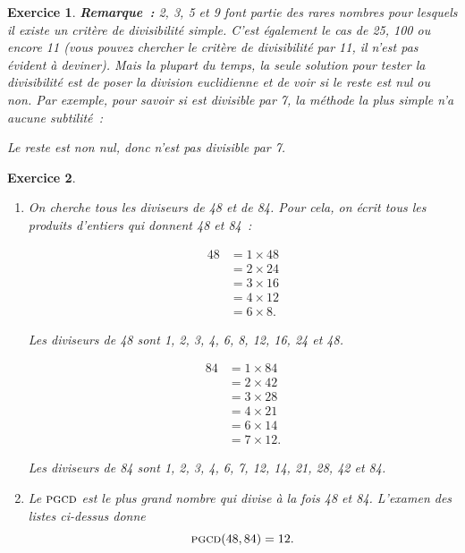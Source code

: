 \documentclass[10pt]{article}
\newtheorem{exo}{Exercice}
\begin{document}
\begin{exo}
\medskip

\textbf{Remarque~:} 2, 3, 5 et 9 font partie des rares nombres pour lesquels il existe un critère de divisibilité simple. C'est également le cas de 25, 100 ou encore 11 (vous pouvez chercher le critère de divisibilité par 11, il n'est pas évident à deviner). Mais la plupart du temps, la seule solution pour tester la divisibilité est de poser la division euclidienne et de voir si le reste est nul ou non. Par exemple, pour savoir si  est divisible par 7, la méthode la plus simple n'a aucune subtilité~:

\begin{center}
\end{center}

Le reste est non nul, donc  n'est pas divisible par 7.

\end{exo}

\begin{exo}
\begin{enumerate}
\item On cherche tous les diviseurs de 48 et de 84. Pour cela, on écrit tous les produits d'entiers qui donnent 48 et 84~:

\setlength{\columnseprule}{1pt}

\begin{multicols}{2}
\begin{align*}
48&=1\times 48\\
&=2\times 24\\
&=3\times 16\\
&=4\times 12\\
&=6\times 8.
\end{align*}

Les diviseurs de 48 sont 1, 2, 3, 4, 6, 8, 12, 16, 24 et 48.

\columnbreak

\begin{align*}
84&=1\times 84\\
&=2\times 42\\
&=3\times 28\\
&=4\times 21\\
&=6\times 14\\
&=7\times 12.
\end{align*}

Les diviseurs de 84 sont 1, 2, 3, 4, 6, 7, 12, 14, 21, 28, 42 et 84.
\end{multicols}

\item Le $\textsc{pgcd}$ est le plus grand nombre qui divise à la fois 48 et 84. L'examen des listes ci-dessus donne \[\textsc{pgcd}(48,84)=12.\]
\end{enumerate}

\end{exo}
\end{document}

